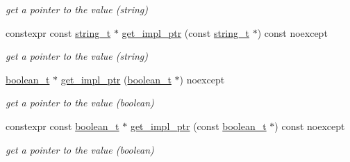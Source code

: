 \begin{DoxyCompactItemize}
\begin{DoxyCompactList}\small\item\em get a pointer to the value (string) \end{DoxyCompactList}\item 
\hypertarget{classnlohmann_1_1basic__json_a007140d8bfbcf963125f5c075c36d61b}{}\label{classnlohmann_1_1basic__json_a007140d8bfbcf963125f5c075c36d61b} 
constexpr const \hyperlink{classnlohmann_1_1basic__json_ab63e618bbb0371042b1bec17f5891f42}{string\+\_\+t} $\ast$ \hyperlink{classnlohmann_1_1basic__json_a007140d8bfbcf963125f5c075c36d61b}{get\+\_\+impl\+\_\+ptr} (const \hyperlink{classnlohmann_1_1basic__json_ab63e618bbb0371042b1bec17f5891f42}{string\+\_\+t} $\ast$) const noexcept
\begin{DoxyCompactList}\small\item\em get a pointer to the value (string) \end{DoxyCompactList}\item 
\hypertarget{classnlohmann_1_1basic__json_a795b46942c3058461b473e92be613769}{}\label{classnlohmann_1_1basic__json_a795b46942c3058461b473e92be613769} 
\hyperlink{classnlohmann_1_1basic__json_af3bc3e83aa162d7ba4df16a949872723}{boolean\+\_\+t} $\ast$ \hyperlink{classnlohmann_1_1basic__json_a795b46942c3058461b473e92be613769}{get\+\_\+impl\+\_\+ptr} (\hyperlink{classnlohmann_1_1basic__json_af3bc3e83aa162d7ba4df16a949872723}{boolean\+\_\+t} $\ast$) noexcept
\begin{DoxyCompactList}\small\item\em get a pointer to the value (boolean) \end{DoxyCompactList}\item 
\hypertarget{classnlohmann_1_1basic__json_af75a09d59d86f100fe2cbf8f724f15ed}{}\label{classnlohmann_1_1basic__json_af75a09d59d86f100fe2cbf8f724f15ed} 
constexpr const \hyperlink{classnlohmann_1_1basic__json_af3bc3e83aa162d7ba4df16a949872723}{boolean\+\_\+t} $\ast$ \hyperlink{classnlohmann_1_1basic__json_af75a09d59d86f100fe2cbf8f724f15ed}{get\+\_\+impl\+\_\+ptr} (const \hyperlink{classnlohmann_1_1basic__json_af3bc3e83aa162d7ba4df16a949872723}{boolean\+\_\+t} $\ast$) const noexcept
\begin{DoxyCompactList}\small\item\em get a pointer to the value (boolean) \end{DoxyCompactList}\item 
\hypertarget{classnlohmann_1_1basic__json_abc4941c0dd9392b813a34ce8d9719eef}{}\label{classnlohmann_1_1basic__json_abc4941c0dd9392b813a34ce8d9719eef} 

\end{DoxyCompactItemize}
